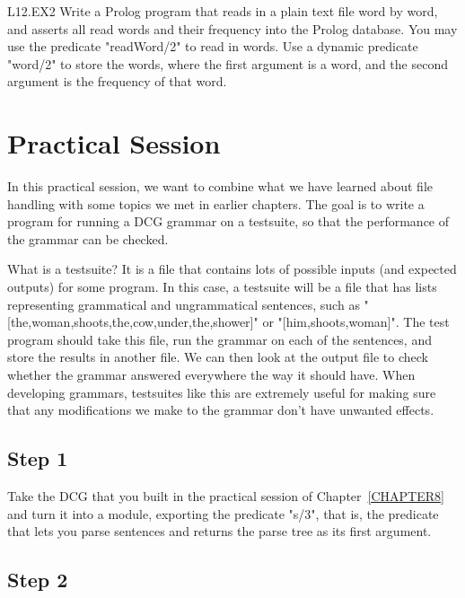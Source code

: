 \begin{LPNexercise}{L12.EX2}
Write a Prolog program that reads in a plain text file word by word,
and asserts all read words and their frequency into the Prolog database. You may use the
predicate "readWord/2" to read in words. Use a dynamic predicate
"word/2" to store the words, where the first argument is a word, and
the second argument is the frequency of that word.
\end{LPNexercise}



\section{Practical Session}\label{SEC.L12.PRAXIS}

In this practical session, we want to combine what we have learned
about file handling with some topics we met in earlier chapters. The
goal is to write a program for running a DCG grammar on a testsuite,
so that the performance of the grammar can be checked.

What is a testsuite? It is a file that contains lots of possible
inputs (and expected outputs) for some program. In this case, a
testsuite will be a file that has lists representing grammatical and
ungrammatical sentences, such as
"[the,woman,shoots,the,cow,under,the,shower]" or
"[him,shoots,woman]". The test program should take this file, run the
grammar on each of the sentences, and store the results in another
file. We can then look at the output file to check whether the grammar
answered everywhere the way it should have. When developing grammars,
testsuites like this are extremely useful for making sure that any
modifications we make to the grammar don't have unwanted effects.



\subsection*{Step 1}\label{L12.PRAXIS.STEP1}

Take the DCG that you built in the practical session of
Chapter~\ref{CHAPTER8} and turn it into a module, exporting the
predicate "s/3", that is, the predicate that lets you parse sentences and
returns the parse tree as its first argument.




\subsection*{Step 2}\label{L12.PRAXIS.STEP2}

